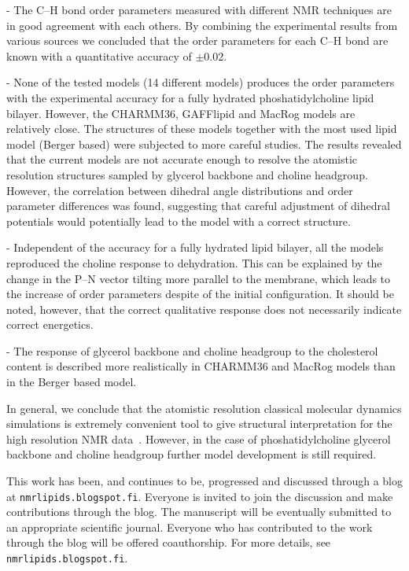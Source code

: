 \documentclass[pre,aps,floatfix,authordate1-4,twocolumn]{revtex4-1}
\begin{document}
- The C--H bond order parameters measured with different NMR techniques are in good agreement
with each others. By combining the experimental results from various sources we concluded
that the order parameters for each C--H bond are known with a quantitative accuracy of $\pm$0.02.

- None of the tested models (14 different models) produces the order parameters with the experimental
accuracy for a fully hydrated phoshatidylcholine lipid bilayer. However, the CHARMM36, GAFFlipid and MacRog 
models are relatively close. The structures of these models together with the most used lipid model (Berger based) 
were subjected to more careful studies. The results revealed that the current models are not accurate
enough to resolve the atomistic resolution structures sampled by glycerol backbone and choline headgroup.  
However, the correlation between dihedral angle distributions and order parameter differences was found, 
suggesting that careful adjustment of dihedral potentials would potentially lead to the model with a correct
structure.

- Independent of the accuracy for a fully hydrated lipid bilayer, all the models reproduced the choline response
to dehydration. This can be explained by the change in the P--N vector tilting more parallel to the membrane,
which leads to the increase of order parameters despite of the initial configuration. It should be noted, however,
that the correct qualitative response does not necessarily indicate correct energetics. 

- The response of glycerol backbone and choline headgroup to the cholesterol content is described more
realistically in CHARMM36 and MacRog models than in the Berger based model.

In general, we conclude that the atomistic resolution classical molecular dynamics simulations 
is extremely convenient tool to give structural interpretation for the high resolution NMR data~\cite{ferreira14}. 
However, in the case of phoshatidylcholine glycerol backbone and choline headgroup further model development is still required.

This work has been, and continues to be, progressed and discussed through a blog at \texttt{nmrlipids.blogspot.fi}. 
Everyone is invited to join the discussion and make contributions through the blog. 
The manuscript will be eventually submitted to an appropriate scientific journal. 
Everyone who has contributed to the work through the blog will be offered 
coauthorship. For more details, see \texttt{nmrlipids.blogspot.fi}. 
\end{document}
